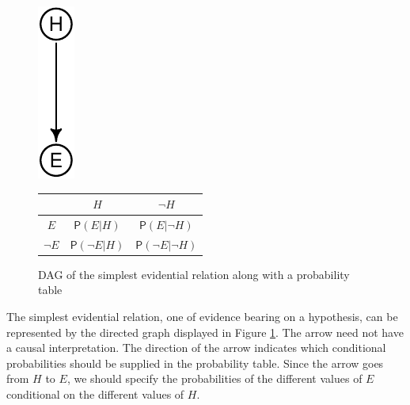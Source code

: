 \documentclass[
  10pt,
  dvipsnames,enabledeprecatedfontcommands]{scrartcl}
\newcommand{\pr}[1]{\ensuremath{\mathsf{P}(#1)}}
\begin{document}
\begin{figure}

\begin{center}\includegraphics{conjunction-paradox4_files/figure-latex/fig:hEDAG-1} \end{center}
\begin{tabular}{c|cc}
& $H$ & $\neg H$ \\
\hline
$E$ & $\pr{E \vert H}$ & $\pr{E\vert \neg H}$ \\
$\neg E$ & $\pr{\neg E\vert H}$ & $\pr{\neg E\vert \neg H}$ \\
\end{tabular}

\caption{DAG of the simplest evidential relation along with a probability table}
\label{fig:hEDAG}
\end{figure}

The simplest evidential relation, one of evidence bearing on a
hypothesis, can be represented by the directed graph displayed in Figure
\ref{fig:hEDAG}. The arrow need not have a causal interpretation. The
direction of the arrow indicates which conditional probabilities should
be supplied in the probability table. Since the arrow goes from \(H\) to
\(E\), we should specify the probabilities of the different values of
\(E\) conditional on the different values of \(H\).
\end{document}
